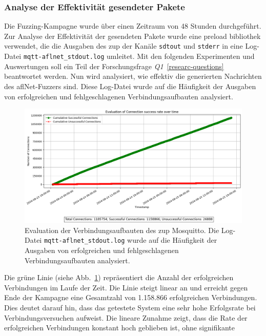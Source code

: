 \subsubsection{Analyse der Effektivität gesendeter Pakete}
Die Fuzzing-Kampagne wurde über einen Zeitraum von 48 Stunden durchgeführt.
Zur Analyse der Effektivität der gesendeten Pakete wurde eine preload bibliothek verwendet, die die Ausgaben des \gls{zup}
der Kanäle \texttt{sdtout} und \texttt{stderr} in eine Log-Datei \texttt{mqtt-aflnet\_stdout.log} umleitet.
Mit den folgenden Experimenten und Auswertungen soll ein Teil der Forschungsfrage \textit{Q1}~\ref{researc-questions}
beantwortet werden.
Nun wird analysiert, wie effektiv die generierten Nachrichten des \gls{afl}Net-Fuzzers sind.\newline
Diese Log-Datei wurde auf die Häufigkeit der Ausgaben von erfolgreichen und fehlgeschlagenen Verbindungsaufbauten analysiert.
\begin{figure}[H]
    \centering
    \includegraphics[width=\textwidth]{img/connection_evaluation_aflnet}
    \caption[Diagram zur Auswertung erfolgreicher Verbindungsaufbauten mit dem \gls{mqtt}-Protokoll]{Evaluation der Verbindungsaufbauten des \gls{zup} Mosquitto. Die Log-Datei \texttt{mqtt-aflnet\_stdout.log}
    wurde auf die Häufigkeit der Ausgaben von erfolgreichen und fehlgeschlagenen Verbindungsaufbauten analysiert.}
    \label{fig:mqtt-aflnet_stdout}
\end{figure}
\noindent Die grüne Linie (siehe Abb.~\ref{fig:mqtt-aflnet_stdout}) repräsentiert die Anzahl der erfolgreichen Verbindungen im Laufe der Zeit.
Die Linie steigt linear an und erreicht gegen Ende der Kampagne eine Gesamtzahl von 1.158.866 erfolgreichen Verbindungen.
Dies deutet darauf hin, dass das getestete System eine sehr hohe Erfolgsrate bei Verbindungsversuchen aufweist.
Die lineare Zunahme zeigt, dass die Rate der erfolgreichen Verbindungen konstant hoch geblieben ist, ohne signifikante
